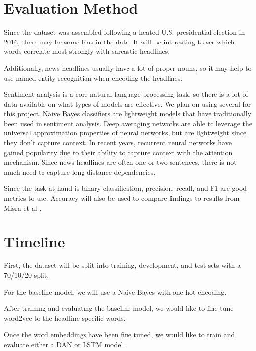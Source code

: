 \documentclass[11pt]{article}
\begin{document}
\section{Evaluation Method}


Since the dataset was assembled following a heated U.S. presidential election
in 2016, there may be some bias in the data. It will be interesting to see
which words correlate most strongly with sarcastic headlines.

Additionally, news headlines usually have a lot of proper nouns, so it may help
to use named entity recognition when encoding the headlines.

Sentiment analysis is a core natural language processing task, so there is a
lot of data available on what types of models are effective. We plan on using
several for this project. Naive Bayes classifiers are lightweight models that
have traditionally been used in sentiment analysis. Deep averaging networks are
able to leverage the universal approximation properties of neural networks, but
are lightweight since they don't capture context. In recent years, recurrent
neural networks have gained popularity due to their ability to capture context
with the attention mechanism. Since news headlines are often one or two
sentences, there is not much need to capture long distance dependencies.

Since the task at hand is binary classification, precision, recall, and F1 are
good metrics to use. Accuracy will also be used to compare findings to results
from Misra et al \cite{misra2023Sarcasm}.

\section{Timeline}
First, the dataset will be split into training, development, and test sets with
a 70/10/20 split.

For the baseline model, we will use a Naive-Bayes with one-hot encoding.

After training and evaluating the baseline model, we would like to fine-tune
word2vec to the headline-specific words.

Once the word embeddings have been fine tuned, we would like to train and
evaluate either a DAN or LSTM model.



\end{document}
